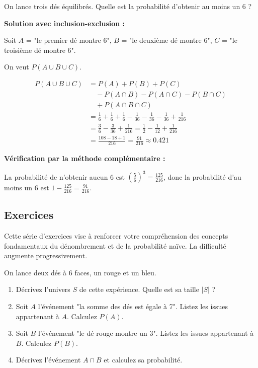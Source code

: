 \begin{examplebox}
On lance trois dés équilibrés. Quelle est la probabilité d'obtenir au moins un 6 ?

\textbf{Solution avec inclusion-exclusion :}

Soit $A$ = "le premier dé montre 6", $B$ = "le deuxième dé montre 6", $C$ = "le troisième dé montre 6".

On veut $P(A \cup B \cup C)$.

\begin{align*}
P(A \cup B \cup C) &= P(A) + P(B) + P(C) \\
&\quad - P(A \cap B) - P(A \cap C) - P(B \cap C) \\
&\quad + P(A \cap B \cap C) \\
&= \frac{1}{6} + \frac{1}{6} + \frac{1}{6} - \frac{1}{36} - \frac{1}{36} - \frac{1}{36} + \frac{1}{216} \\
&= \frac{3}{6} - \frac{3}{36} + \frac{1}{216} = \frac{1}{2} - \frac{1}{12} + \frac{1}{216} \\
&= \frac{108 - 18 + 1}{216} = \frac{91}{216} \approx 0.421
\end{align*}

\textbf{Vérification par la méthode complémentaire :}

La probabilité de n'obtenir aucun 6 est $\left(\frac{5}{6}\right)^3 = \frac{125}{216}$, donc la probabilité d'au moins un 6 est $1 - \frac{125}{216} = \frac{91}{216}$.
\end{examplebox}

\subsection{Exercices}

Cette série d'exercices vise à renforcer votre compréhension des concepts fondamentaux du dénombrement et de la probabilité naïve. La difficulté augmente progressivement.


\begin{exercicebox}
On lance deux dés à 6 faces, un rouge et un bleu.
\begin{enumerate}
    \item Décrivez l'univers $S$ de cette expérience. Quelle est sa taille $|S|$ ?
    \item Soit $A$ l'événement "la somme des dés est égale à 7". Listez les issues appartenant à $A$. Calculez $P(A)$.
    \item Soit $B$ l'événement "le dé rouge montre un 3". Listez les issues appartenant à $B$. Calculez $P(B)$.
    \item Décrivez l'événement $A \cap B$ et calculez sa probabilité.
\end{enumerate}
\end{exercicebox}

